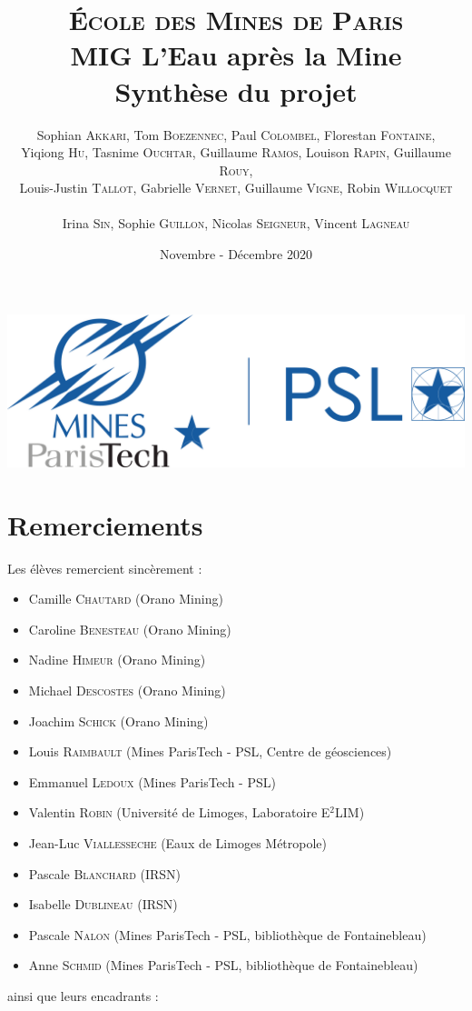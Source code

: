\documentclass{article}
\title{ \textbf{ {\color{couleurmines}
\Huge{\textsc{École des Mines de Paris}}\\
\vspace{1 cm}
MIG L'Eau après la Mine\\\vspace{1 cm}Synthèse du projet}}
\vspace{1 cm}
}
\author{Sophian \textsc{Akkari},
Tom \textsc{Boezennec}, 
Paul \textsc{Colombel}, 
Florestan \textsc{Fontaine},\\
Yiqiong \textsc{Hu}, 
Tasnime \textsc{Ouchtar}, 
Guillaume \textsc{Ramos}, 
Louison \textsc{Rapin}, 
Guillaume \textsc{Rouy},\\ 
Louis-Justin \textsc{Tallot}, 
Gabrielle \textsc{Vernet}, 
Guillaume \textsc{Vigne}, 
Robin \textsc{Willocquet}\\
\\ Irina \textsc{Sin}, 
Sophie \textsc{Guillon}, 
Nicolas \textsc{Seigneur}, 
Vincent \textsc{Lagneau}}
\date{\vspace{2 cm}Novembre - Décembre 2020}
\begin{document}

\maketitle
\thispagestyle{empty}
\vspace{2 cm}
\begin{center}
    \includegraphics[width = 0.4\linewidth]{logoMPT.png}
\end{center}
\newpage
{}

\section*{Remerciements}
Les élèves remercient sincèrement : 
\begin{itemize}
    \item Camille \textsc{Chautard} (Orano Mining)
    \item Caroline \textsc{Benesteau} (Orano Mining)
    \item Nadine \textsc{Himeur} (Orano Mining)
    \item Michael \textsc{Descostes} (Orano Mining)
    \item Joachim \textsc{Schick} (Orano Mining)
    \item Louis \textsc{Raimbault} (Mines ParisTech - PSL, Centre de géosciences) 
    \item  Emmanuel \textsc{Ledoux} (Mines ParisTech - PSL)
    \item Valentin \textsc{Robin} (Université de Limoges, Laboratoire E$^2$LIM) 
    \item Jean-Luc \textsc{Viallesseche} (Eaux de Limoges Métropole)
    \item Pascale \textsc{Blanchard} (IRSN)  
    \item Isabelle \textsc{Dublineau} (IRSN)    
    \item  Pascale \textsc{Nalon} (Mines ParisTech - PSL, bibliothèque de Fontainebleau)
    \item Anne \textsc{Schmid} (Mines ParisTech - PSL, bibliothèque de Fontainebleau)
\end{itemize}

ainsi que leurs encadrants :
\end{document}

